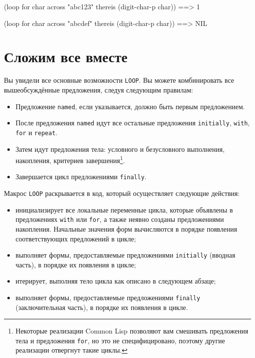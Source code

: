 \begin{myverb}
(loop for char across "abc123" thereis (digit-char-p char)) ==> 1

(loop for char across "abcdef" thereis (digit-char-p char)) ==> NIL
\end{myverb}

\section{Сложим все вместе}

Вы увидели все основные возможности \lstinline{LOOP}. Вы можете комбинировать все вышеобсуждённые
предложения, следуя следующим правилам:

\begin{itemize}
\item Предложение \lstinline{named}, если указывается, должно быть первым предложением.
\item После предложения \lstinline{named} идут все остальные предложения \lstinline{initially},
  \lstinline{with}, \lstinline{for} и \lstinline{repeat}.
\item Затем идут предложения тела: условного и безусловного выполнения, накопления,
  критериев завершения\footnote{Некоторые реализации Common Lisp позволяют вам смешивать
    предложения тела и предложения \lstinline{for}, но это не специфицировано, поэтому другие
    реализации отвергнут такие циклы.}\hspace{\footnotenegspace}.
\item Завершается цикл предложениями \lstinline{finally}.
\end{itemize}

Макрос \lstinline{LOOP} раскрывается в код, который осуществляет следующие действия:

\begin{itemize}
\item инициализирует все локальные переменные цикла, которые объявлены в предложениях
  \lstinline{with} или \lstinline{for}, а также неявно созданы предложениями накопления. Начальные
  значения форм вычисляются в порядке появления соответствующих предложений в цикле;
\item выполняет формы, предоставляемые предложениями \lstinline{initially} (вводная часть), в
  порядке их появления в цикле;
\item итерирует, выполняя тело цикла как описано в следующем абзаце;
\item выполняет формы, предоставляемые предложениями \lstinline{finally} (заключительная
  часть), в порядке их появления в цикле.
\end{itemize}

